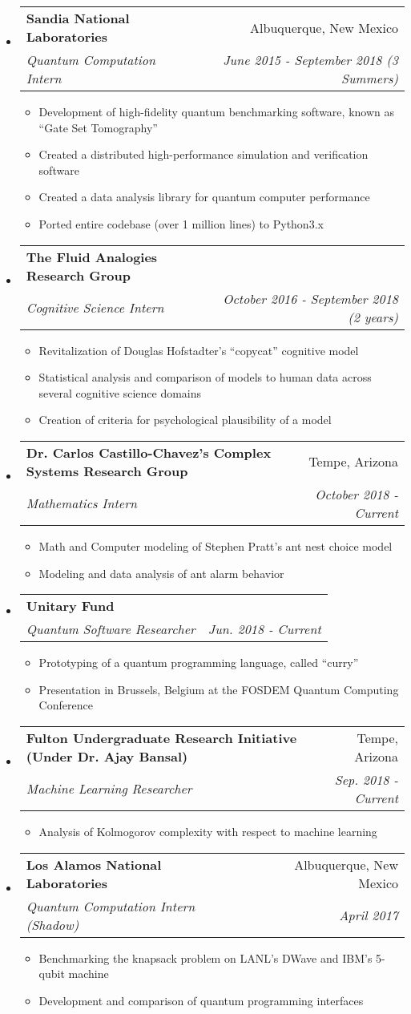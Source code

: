 \documentclass[letterpaper,11pt]{article}
\makeatletter
\newcommand{\resitem}[1]{\item #1 \vspace{-2pt}}
\newcommand{\resheading}[1]{{\large \parashade[.9]{sharpcorners}{\textbf{\underline{#1} \vphantom{p\^{E}}}}}}
\newcommand{\ressubheading}[4]{
\begin{tabular*}{6.5in}{l@{\extracolsep{\fill}}r}
		\textbf{#1} & #2 \\
		\textit{#3} & \textit{#4} \\
\end{tabular*}\vspace{-6pt}}
\makeatother
\begin{document}
\resheading{Work Experience}
\begin{itemize}
 \item
     \ressubheading{Sandia National Laboratories}{Albuquerque, New Mexico}{Quantum Computation Intern}{June 2015 - September 2018 (3 Summers)}
 	\begin{itemize}
            \resitem{Development of high-fidelity quantum benchmarking software, known as ``Gate Set Tomography''}
 		\resitem{Created a distributed high-performance simulation and verification software}
 		\resitem{Created a data analysis library for quantum computer performance}
        \resitem{Ported entire codebase (over 1 million lines) to Python3.x}
 	\end{itemize}
 \item
     \ressubheading{The Fluid Analogies Research Group}{}{Cognitive Science Intern}{October 2016 - September 2018 (2 years)}
 	\begin{itemize}
 		\resitem{Revitalization of Douglas Hofstadter's ``copycat'' cognitive model}
 		\resitem{Statistical analysis and comparison of models to human data across several cognitive science domains}
 		\resitem{Creation of criteria for psychological plausibility of a model}
 	\end{itemize}
 \item
     \ressubheading{Dr. Carlos Castillo-Chavez's Complex Systems Research Group}{Tempe, Arizona}{Mathematics Intern}{October 2018 - Current}
 	\begin{itemize}
 		\resitem{Math and Computer modeling of Stephen Pratt's ant nest choice model}
 		\resitem{Modeling and data analysis of ant alarm behavior}
 	\end{itemize}
 \item
     \ressubheading{Unitary Fund}{}{Quantum Software Researcher}{Jun. 2018 - Current}
 	\begin{itemize}
            \resitem{Prototyping of a quantum programming language, called ``curry''}
            \resitem{Presentation in Brussels, Belgium at the FOSDEM Quantum Computing Conference}
 	\end{itemize}
 \item
     \ressubheading{Fulton Undergraduate Research Initiative (Under Dr. Ajay Bansal)}{Tempe, Arizona}{Machine Learning Researcher}{Sep. 2018 - Current}
 	\begin{itemize}
 		\resitem{Analysis of Kolmogorov complexity with respect to machine learning}
 	\end{itemize}
 \item
     \ressubheading{Los Alamos National Laboratories}{Albuquerque, New Mexico}{Quantum Computation Intern (Shadow)}{April 2017}
 	\begin{itemize}
 		\resitem{Benchmarking the knapsack problem on LANL's DWave and IBM's 5-qubit machine}
 		\resitem{Development and comparison of quantum programming interfaces}
 	\end{itemize}
\end{itemize}
\end{document}
